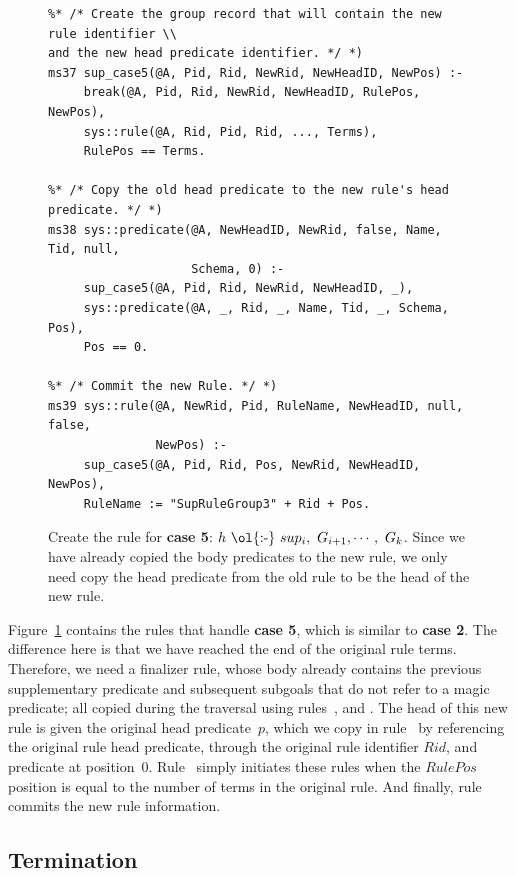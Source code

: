 \begin{figure}[!t]
\ssp
\centering
\begin{lstlisting}
%* /* Create the group record that will contain the new rule identifier \\
and the new head predicate identifier. */ *)
ms37 sup_case5(@A, Pid, Rid, NewRid, NewHeadID, NewPos) :-
     break(@A, Pid, Rid, NewRid, NewHeadID, RulePos, NewPos),
     sys::rule(@A, Rid, Pid, Rid, ..., Terms),
     RulePos == Terms.
	
%* /* Copy the old head predicate to the new rule's head predicate. */ *)
ms38 sys::predicate(@A, NewHeadID, NewRid, false, Name, Tid, null, 
                    Schema, 0) :-
     sup_case5(@A, Pid, Rid, NewRid, NewHeadID, _),
     sys::predicate(@A, _, Rid, _, Name, Tid, _, Schema, Pos),
     Pos == 0.
	
%* /* Commit the new Rule. */ *)
ms39 sys::rule(@A, NewRid, Pid, RuleName, NewHeadID, null, false, 
               NewPos) :-
     sup_case5(@A, Pid, Rid, Pos, NewRid, NewHeadID, NewPos),
     RuleName := "SupRuleGroup3" + Rid + Pos.
\end{lstlisting}
\caption{\label{ch:magic:fig:rewrite9} 
Create the rule for {\bf case 5}: $h\ \text{\ol{:-}}\ sup_i,\ G_{i+1}, \cdots,\ G_k$. 
Since we have already copied the body predicates to the new rule, we only
need copy the head predicate from the old rule to be the head of the new rule.}
\end{figure}

Figure~\ref{ch:magic:fig:rewrite9} contains the rules that handle {\bf case 5},
which is similar to {\bf case 2}.  The difference here is that we have reached
the end of the original rule terms.  Therefore, we need a finalizer rule, whose
body already contains the previous supplementary predicate and subsequent
subgoals that do not refer to a magic predicate; all copied during the
 traversal using rules~,  and .  The
head of this new rule is given the original head predicate~$p$, which we copy
in rule~ by referencing the original rule head predicate, through the
original rule identifier $Rid$, and predicate at position~$0$.  Rule~
simply initiates these rules when the $RulePos$ position is equal to the number
of terms in the original rule.  And finally, rule~ commits the new
rule information.

\subsection{Termination}

